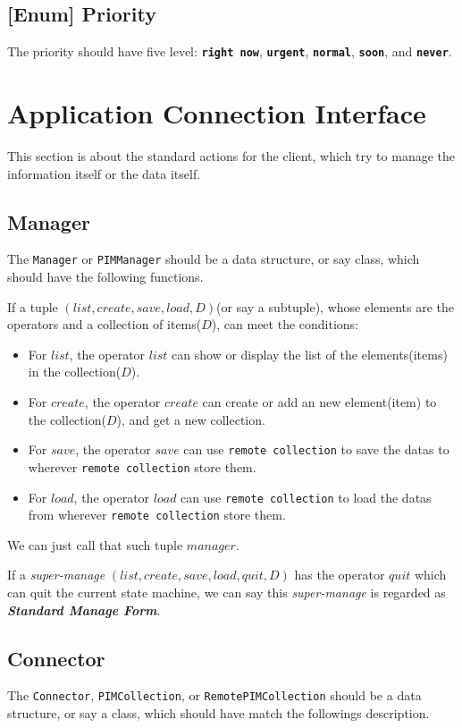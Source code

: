 \documentclass{article}
\begin{document}
    
    \subsection{[Enum] Priority}
    The priority should have five level: \texttt{\textbf{right now}}, \texttt{\textbf{urgent}}, \texttt{\textbf{normal}}, \texttt{\textbf{soon}}, and \texttt{\textbf{never}}.
    
    \section{Application Connection Interface}
    This section is about the standard actions for the client, which try to manage the information itself or the data itself.
    
    \subsection{Manager}
    The \lstinline|Manager| or \lstinline|PIMManager| should be a data structure, or say class, which should have the following functions.
    
    If a tuple $(list,create,save,load,D)$(or say a subtuple), whose elements are the operators and a collection of items($D$), can meet the conditions:
    \begin{itemize}
        \item For $list$, the operator $list$ can show or display the list of the elements(items) in the collection($D$).
        \item For $create$, the operator $create$ can create or add an new element(item) to the collection($D$), and get a new collection.
        \item For $save$, the operator $save$ can use \verb|remote collection| to save the datas to wherever 
        \verb|remote collection| store them.
        \item For $load$, the operator $load$ can use \verb|remote collection| to load the datas from wherever
        \verb|remote collection| store them.
    \end{itemize}
    We can just call that such tuple $manager$. 
    
    If a \textit{super-manage} $(list,create,save,load,quit,D)$ has the operator $quit$ which can quit the current state machine,
    we can say this \textit{super-manage} is regarded as \textbf{\textit{Standard Manage Form}}. 

   \subsection{Connector}
   The \lstinline|Connector|, \lstinline|PIMCollection|, or \lstinline|RemotePIMCollection| should be a data structure, or say a class,
   which should have match the followings description.
\end{document}

